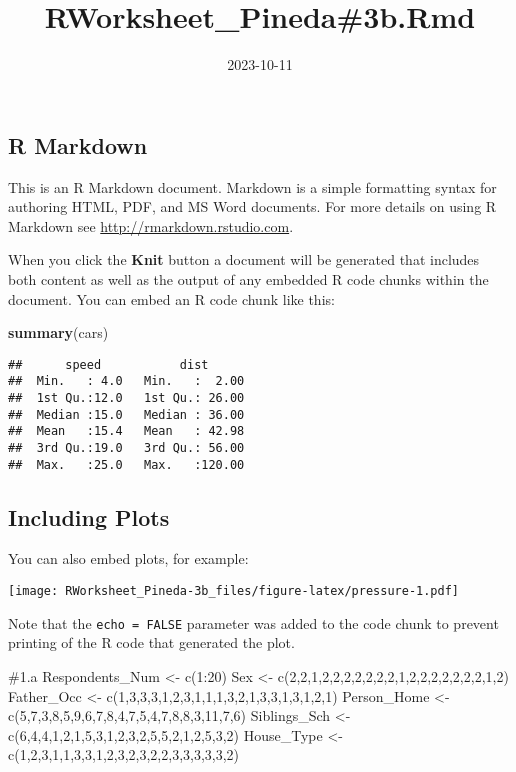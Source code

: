 \documentclass[
]{article}
\title{RWorksheet\_Pineda\#3b.Rmd}
\author{}
\date{\vspace{-2.5em}2023-10-11}
\newenvironment{Shaded}{\begin{snugshade}}{\end{snugshade}}
\newcommand{\FunctionTok}[1]{\textcolor[rgb]{0.13,0.29,0.53}{\textbf{#1}}}
\newcommand{\NormalTok}[1]{#1}
\begin{document}
\maketitle

\hypertarget{r-markdown}{%
\subsection{R Markdown}\label{r-markdown}}

This is an R Markdown document. Markdown is a simple formatting syntax
for authoring HTML, PDF, and MS Word documents. For more details on
using R Markdown see \url{http://rmarkdown.rstudio.com}.

When you click the \textbf{Knit} button a document will be generated
that includes both content as well as the output of any embedded R code
chunks within the document. You can embed an R code chunk like this:

\begin{Shaded}
\begin{Highlighting}[]
\FunctionTok{summary}\NormalTok{(cars)}
\end{Highlighting}
\end{Shaded}

\begin{verbatim}
##      speed           dist       
##  Min.   : 4.0   Min.   :  2.00  
##  1st Qu.:12.0   1st Qu.: 26.00  
##  Median :15.0   Median : 36.00  
##  Mean   :15.4   Mean   : 42.98  
##  3rd Qu.:19.0   3rd Qu.: 56.00  
##  Max.   :25.0   Max.   :120.00
\end{verbatim}

\hypertarget{including-plots}{%
\subsection{Including Plots}\label{including-plots}}

You can also embed plots, for example:

\texttt{[image: RWorksheet\_Pineda-3b\_files/figure-latex/pressure-1.pdf]}

Note that the \texttt{echo\ =\ FALSE} parameter was added to the code
chunk to prevent printing of the R code that generated the plot.

\#1.a Respondents\_Num \textless- c(1:20) Sex \textless-
c(2,2,1,2,2,2,2,2,2,2,1,2,2,2,2,2,2,2,1,2) Father\_Occ \textless-
c(1,3,3,3,1,2,3,1,1,1,3,2,1,3,3,1,3,1,2,1) Person\_Home \textless-
c(5,7,3,8,5,9,6,7,8,4,7,5,4,7,8,8,3,11,7,6) Siblings\_Sch \textless-
c(6,4,4,1,2,1,5,3,1,2,3,2,5,5,2,1,2,5,3,2) House\_Type \textless-
c(1,2,3,1,1,3,3,1,2,3,2,3,2,2,3,3,3,3,3,2)
\end{document}
